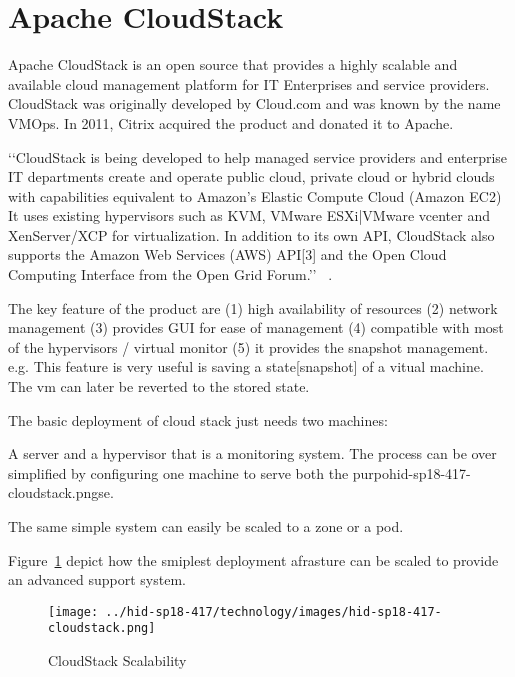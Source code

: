 
\section{Apache CloudStack}

Apache CloudStack is an open source that provides a highly scalable
and available cloud management platform for IT Enterprises and service
providers. CloudStack was originally developed by Cloud.com and was
known by the name VMOps.  In 2011, Citrix acquired the product and
donated it to Apache.

‘‘CloudStack is being developed to help managed service providers and
enterprise IT departments create and operate public cloud, private
cloud or hybrid clouds with capabilities equivalent to Amazon's
Elastic Compute Cloud (Amazon EC2) It uses existing hypervisors such
as KVM, VMware ESXi|VMware vcenter and XenServer/XCP for
virtualization. In addition to its own API, CloudStack also supports
the Amazon Web Services (AWS) API[3] and the Open Cloud Computing
Interface from the Open Grid Forum.’’  ~\cite{
  hid-sp18-417-wiki-cloudStack}.

The key feature of the product are 
(1) high availability of resources
(2) network management
(3) provides GUI for ease of management
(4) compatible with most of the hypervisors / virtual monitor
(5) it provides the snapshot management. e.g. This feature is 
very useful is saving a state[snapshot] of a vitual machine. 
The vm can later be reverted to the stored state.  

The basic deployment of cloud stack just needs two machines: 
 
A server and a hypervisor that is a monitoring system.  The process
can be over simplified by configuring one machine to serve both the
purpohid-sp18-417-cloudstack.pngse.
 
The same simple system can easily be scaled to a zone or a pod.

Figure~\ref{F:cloudstack-scalabuility} depict how the smiplest
deployment afrasture can be scaled to provide an advanced support
system.

\begin{figure}[htb]
  \texttt{[image: ../hid-sp18-417/technology/images/hid-sp18-417-cloudstack.png]}
  \caption{CloudStack Scalability ~\cite{hid-sp18-417-cloudstack-scaling}}
  \label{F:cloudstack-scalabuility}
\end{figure}

